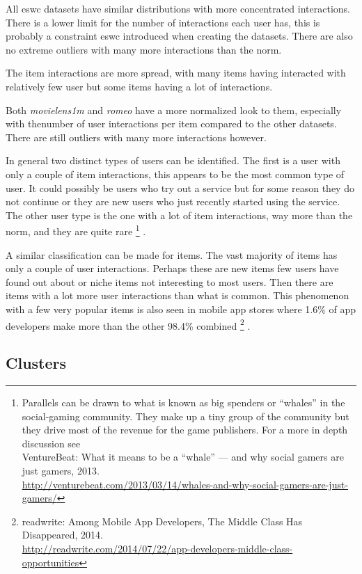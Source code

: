 

\FloatBarrier

All eswc datasets have similar distributions with more concentrated interactions. There is a lower limit for the number of interactions each user has, this is probably a constraint eswc introduced when creating the datasets. There are also no extreme outliers with many more interactions than the norm.

The item interactions are more spread, with many items having interacted with relatively few user but some items having a lot of interactions.

\newpage



Both \textit{movielens1m} and \textit{romeo} have a more normalized look to them, especially with thenumber of user interactions per item compared to the other datasets. There are still outliers with many more interactions however.

\FloatBarrier

In general two distinct types of users can be identified. The first is a user with only a couple of item interactions, this appears to be the most common type of user. It could possibly be users who try out a service but for some reason they do not continue or they are new users who just recently started using the service. The other user type is the one with a lot of item interactions, way more than the norm, and they are quite rare
\footnote{Parallels can be drawn to what is known as big spenders or ``whales'' in the social-gaming community. They make up a tiny group of the community but they drive most of the revenue for the game publishers. For a more in depth discussion see \\
VentureBeat: What it means to be a ``whale'' — and why social gamers are just gamers, 2013. \\
\url{http://venturebeat.com/2013/03/14/whales-and-why-social-gamers-are-just-gamers/} }
.

A similar classification can be made for items. The vast majority of items has only a couple of user interactions. Perhaps these are new items few users have found out about or niche items not interesting to most users. Then there are items with a lot more user interactions than what is common. This phenomenon with a few very popular items is also seen in mobile app stores where 1.6\% of app developers make more than the other 98.4\% combined
\footnote{
readwrite: Among Mobile App Developers, The Middle Class Has Disappeared, 2014. \\
\url{http://readwrite.com/2014/07/22/app-developers-middle-class-opportunities}
}
.


\subsection{Clusters}\label{sec:result:clusters}

